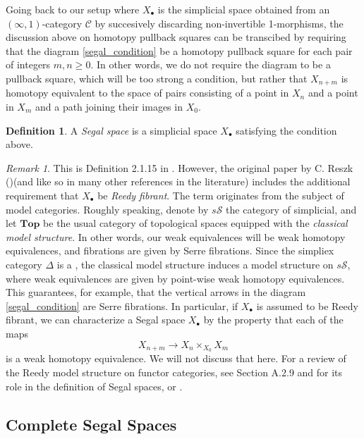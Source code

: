 \documentclass[a4paper,11pt]{article}
\newcommand{\ccal}{\mathcal{C}}
\newcommand{\topo}{\mathbf{Top}}
\newcommand{\scal}{\mathcal{S}}
\theoremstyle{plain}
\theoremstyle{definition}
\newtheorem{defi}[thm]{Definition}
\theoremstyle{remark}
\newtheorem*{rem}{Remark}
\begin{document}
Going back to our setup where $X_{\bullet}$ is the simplicial space obtained from an $(\infty, 1)$-category $\ccal$ by succesively discarding non-invertible 1-morphisms, the discussion above on homotopy pullback squares can be transcibed by requiring that the diagram \eqref{segal_condition} be a homotopy pullback square for each pair of integers $m, n \geq 0$.  In other words, we do not require the diagram to be a pullback square, which will be too strong a condition, but rather that $X_{n+m}$ is homotopy equivalent to the space of pairs consisting of a point in $X_n$ and a point in $X_m$ and a path joining their images in $X_0$. 

\begin{defi}
A \textit{Segal space} is a simplicial space $X_{\bullet}$ satisfying the condition above. 
\end{defi}


\begin{rem}
This is Definition 2.1.15 in \cite{lurie}. However, the original paper by C. Reszk (\cite{rezk})(and like so in many other references in the literature) includes the additional requirement that $X_{\bullet}$ be \textit{Reedy fibrant}. The term originates from the subject of model categories. Roughly speaking, denote by $s \scal$ the category of simplicial, and let $\topo$ be the usual category of topological spaces equipped with the \textit{classical model structure}. In other words, our weak equivalences will be weak homotopy equivalences, and fibrations are given by Serre fibrations. Since the simpliex category $\Delta$ is a , the classical model structure induces a model structure on $s \scal$, where weak equivalences are given by point-wise weak homotopy equivalences. This guarantees, for example, that the vertical arrows in the diagram \eqref{segal_condition} are Serre fibrations. In particular, if $X_{\bullet}$ is assumed to be Reedy fibrant, we can characterize a Segal space $X_{\bullet}$ by the property that each of the maps 
$$X_{n+m} \to X_n \times_{X_0} X_m$$
is a weak homotopy equivalence. We will not discuss that here. For a review of the Reedy model structure on functor categories, see \cite{lurie} Section A.2.9 and for its role in the definition of Segal spaces, \cite{rezk} or \cite{nima}. 
\end{rem}

\subsection{Complete Segal Spaces}
\end{document}
